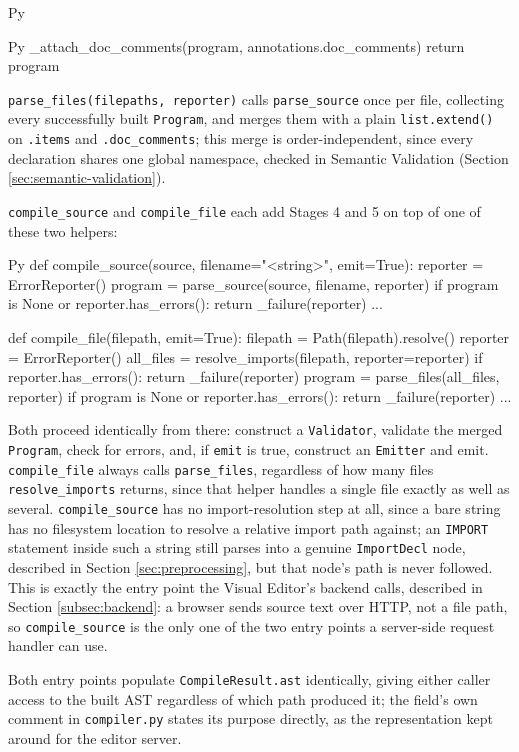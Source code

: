 \begin{codeblock}[]{Py}
\begin{codeblock}[]{Py}
    _attach_doc_comments(program, annotations.doc_comments)
    return program
\end{codeblock}
\lstinline|parse_files(filepaths, reporter)| calls \lstinline|parse_source| once per file, collecting every successfully built \lstinline|Program|, and merges them with a plain \lstinline|list.extend()| on \lstinline|.items| and \lstinline|.doc_comments|; this merge is order-independent, since every declaration shares one global namespace, checked in Semantic Validation (Section \ref{sec:semantic-validation}).

\lstinline|compile_source| and \lstinline|compile_file| each add Stages 4 and 5 on top of one of these two helpers:
\begin{codeblock}[]{Py}
def compile_source(source, filename="<string>", emit=True):
    reporter = ErrorReporter()
    program = parse_source(source, filename, reporter)
    if program is None or reporter.has_errors():
        return _failure(reporter)
    ...

def compile_file(filepath, emit=True):
    filepath = Path(filepath).resolve()
    reporter = ErrorReporter()
    all_files = resolve_imports(filepath, reporter=reporter)
    if reporter.has_errors():
        return _failure(reporter)
    program = parse_files(all_files, reporter)
    if program is None or reporter.has_errors():
        return _failure(reporter)
    ...
\end{codeblock}
Both proceed identically from there: construct a \lstinline|Validator|, validate the merged \lstinline|Program|, check for errors, and, if \lstinline|emit| is true, construct an \lstinline|Emitter| and emit. \lstinline|compile_file| always calls \lstinline|parse_files|, regardless of how many files \lstinline|resolve_imports| returns, since that helper handles a single file exactly as well as several. \lstinline|compile_source| has no import-resolution step at all, since a bare string has no filesystem location to resolve a relative import path against; an \lstinline|IMPORT| statement inside such a string still parses into a genuine \lstinline|ImportDecl| node, described in Section \ref{sec:preprocessing}, but that node's path is never followed. This is exactly the entry point the Visual Editor's backend calls, described in Section \ref{subsec:backend}: a browser sends source text over HTTP, not a file path, so \lstinline|compile_source| is the only one of the two entry points a server-side request handler can use.

Both entry points populate \lstinline|CompileResult.ast| identically, giving either caller access to the built AST regardless of which path produced it; the field's own comment in \lstinline|compiler.py| states its purpose directly, as the representation kept around for the editor server.


\end{codeblock}
